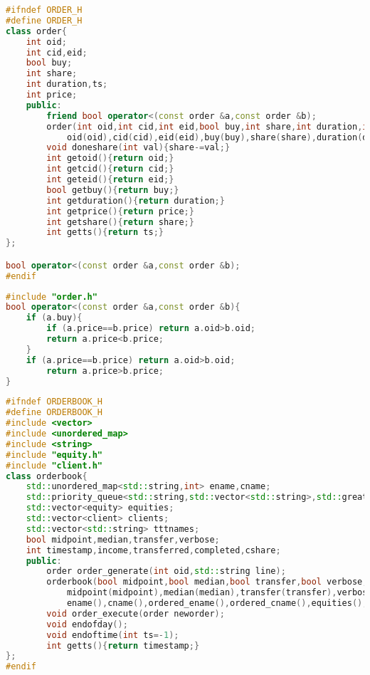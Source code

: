 \documentclass{article}
\begin{document}
\begin{lstlisting}[title=order.h,language=C++]
#ifndef ORDER_H
#define ORDER_H
class order{
    int oid;
    int cid,eid;
    bool buy;
    int share;
    int duration,ts;
    int price;
    public:
        friend bool operator<(const order &a,const order &b);
        order(int oid,int cid,int eid,bool buy,int share,int duration,int ts,int price):
            oid(oid),cid(cid),eid(eid),buy(buy),share(share),duration(duration),ts(ts),price(price){}
        void doneshare(int val){share-=val;}
        int getoid(){return oid;}
        int getcid(){return cid;}
        int geteid(){return eid;}
        bool getbuy(){return buy;}
        int getduration(){return duration;}
        int getprice(){return price;}
        int getshare(){return share;}
        int getts(){return ts;}
};

bool operator<(const order &a,const order &b);
#endif
\end{lstlisting}

\begin{lstlisting}[title=order.cpp,language=C++]
#include "order.h"
bool operator<(const order &a,const order &b){
    if (a.buy){
        if (a.price==b.price) return a.oid>b.oid;
        return a.price<b.price;
    }
    if (a.price==b.price) return a.oid>b.oid;
        return a.price>b.price;
}
\end{lstlisting}

\begin{lstlisting}[title=orderbook.h,language=C++]
#ifndef ORDERBOOK_H
#define ORDERBOOK_H
#include <vector>
#include <unordered_map>
#include <string>
#include "equity.h"
#include "client.h"
class orderbook{
    std::unordered_map<std::string,int> ename,cname;
    std::priority_queue<std::string,std::vector<std::string>,std::greater<std::string> > ordered_ename,ordered_cname;
    std::vector<equity> equities;
    std::vector<client> clients;
    std::vector<std::string> tttnames;
    bool midpoint,median,transfer,verbose;
    int timestamp,income,transferred,completed,cshare;
    public:
        order order_generate(int oid,std::string line);
        orderbook(bool midpoint,bool median,bool transfer,bool verbose,std::vector<std::string> tttnames):
            midpoint(midpoint),median(median),transfer(transfer),verbose(verbose),tttnames(tttnames),
            ename(),cname(),ordered_ename(),ordered_cname(),equities(),clients(),timestamp(0),income(0),transferred(0),completed(0),cshare(0){}
        void order_execute(order neworder);
        void endofday();
        void endoftime(int ts=-1);
        int getts(){return timestamp;}
};
#endif
\end{lstlisting}
\end{document}
